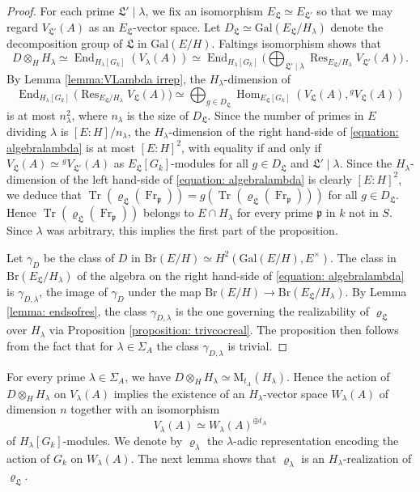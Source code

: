 \documentclass[oneside]{amsart}
\theoremstyle{remark}
\newcommand{\Gal}{\mathrm{Gal}}
\newcommand{\M}{\mathrm{M }}
\newcommand{\End}{\operatorname{End}}
\newcommand{\Hom}{\operatorname{Hom}}
\newcommand{\Frob}{\operatorname{Fr}}
\newcommand{\Br}{\mathrm{Br}}
\newcommand{\p}{\mathfrak{p}}
\newcommand{\Res}{\operatorname{Res}}
\newcommand{\Tr}{\operatorname{Tr}}
\newcommand{\Ll}{\mathfrak{L}}
\numberwithin{equation}{section}
\begin{document}
\begin{proof}
For each prime $\Ll'\mid \lambda$, we fix an isomorphism $E_\Ll\simeq E_{\Ll'}$ so that we may regard $V_{\Ll'}(A)$ as an $E_{\Ll}$-vector space. Let $D_\Ll\simeq \Gal(E_\Ll/H_\lambda)$ denote the decomposition group of $\Ll$ in $\Gal(E/H)$. Faltings isomorphism shows that 
\begin{equation}\label{equation: algebralambda}
D\otimes_H H_{\lambda}\simeq \End_{H_\lambda[G_k]}(V_\lambda(A)) \simeq \End_{H_\lambda[G_k]}\big( \bigoplus_{\Ll'\mid \lambda} \Res_{E_{\Ll}/H_\lambda} V_{\Ll'}(A)\big)\,.
\end{equation}
By Lemma \ref{lemma:VLambda irrep}, the $H_\lambda$-dimension of
$$
\End_{H_\lambda[G_k]}\big(  \Res_{E_{\Ll}/H_\lambda} V_{\Ll}(A)\big)\simeq \bigoplus_{g\in D_{\Ll}}\Hom_{E_\Ll[G_k]}( V_{\Ll}(A),{}^gV_{\Ll}(A))
$$
is at most $n_\lambda^2$, where $n_\lambda$ is the size of $D_{\Ll}$.
Since the number of primes in $E$ dividing $\lambda$ is $[E:H]/n_\lambda$, the $H_\lambda$-dimension of the right hand-side of \eqref{equation: algebralambda} is at most $[E:H]^2$,
with equality if and only if $V_{\Ll}(A)\simeq {}^gV_{\Ll'}(A)$ as $E_\Ll[G_k]$-modules for all $g \in D_\Ll$ and $\Ll'\mid \lambda $.  Since the $H_\lambda$-dimension of the left hand-side of \eqref{equation: algebralambda} is clearly $[E:H]^2$, we deduce that $\Tr(\varrho_\Ll(\Frob_\p))=g(\Tr(\varrho_\Ll(\Frob_\p)))$ for all $g \in D_\Ll$. Hence $\Tr(\varrho_\Ll(\Frob_\p))$ belongs to $E\cap H_\lambda$ for every prime $\p$ in $k$ not in $S$. Since $\lambda$ was arbitrary, this implies the first part of the proposition.

Let $\gamma_D$ be the class of $D$ in $\Br(E/H) \simeq H^2(\Gal(E/H),E^\times)$.
The class in $\Br(E_{\Ll}/H_\lambda)$ of the algebra on the right hand-side of \eqref{equation: algebralambda} is $\gamma_{D,\lambda}$, the image of $\gamma_D$ under the map $\Br(E/H)\rightarrow  \Br(E_{\Ll}/H_\lambda)$. By Lemma \ref{lemma: endsofres}, the class $\gamma_{D,\lambda}$ is the one governing the realizability of $\varrho_\Ll$ over $H_\lambda$ via Proposition \ref{proposition: trivcocreal}. The proposition then follows from the fact that for $\lambda \in \Sigma_A$ the class $\gamma_{D,\lambda}$ is trivial.
 \end{proof}

  
For every prime $\lambda\in \Sigma_A$, we have $D\otimes_H H_\lambda\simeq \M_{t_A}(H_\lambda)$. Hence the action of $D\otimes_H H_\lambda$ on $V_\lambda(A)$ implies the existence of an $H_\lambda$-vector space $W_\lambda(A)$ of dimension $n$ together with an isomorphism
$$
V_\lambda(A)\simeq W_\lambda(A)^{\oplus t_A} 
$$
of $H_\lambda[G_k]$-modules. We denote by $\varrho_\lambda$ the $\lambda$-adic representation encoding the action of $G_k$ on $W_\lambda(A)$. The next lemma shows that $\varrho_\lambda$ is an $H_\lambda$-realization of $\varrho_{\Ll}$.
\end{document}
